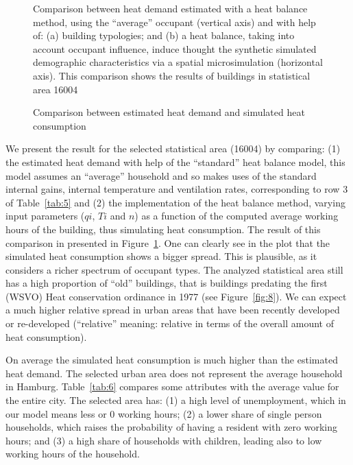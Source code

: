 \documentclass[11pt]{IJM-article}
\begin{document}
\begin{figure}[htb] 
    \centering 
    \caption{Comparison between estimated heat demand and simulated heat
    consumption}
    \label{fig:7}
    \begin{flushleft}
    \begin{footnotesize}
        Comparison between heat demand estimated with a heat balance method,
        using the ``average'' occupant (vertical axis) and with help of: (a)
        building typologies; and (b) a heat balance, taking into account
        occupant influence, induce thought the synthetic simulated demographic
        characteristics via a spatial microsimulation (horizontal axis). This
        comparison shows the results of buildings in statistical area 16004
    \end{footnotesize}
    \end{flushleft}
\end{figure}

We present the result for the selected statistical area (16004) by comparing:
(1) the estimated heat demand with help of the ``standard'' heat balance model,
this model assumes an ``average'' household and so makes uses of the standard
internal gains, internal temperature and ventilation rates, corresponding to
row 3 of Table~\ref{tab:5} and (2) the implementation of the heat balance
method, varying input parameters ($qi$, $Ti$ and $n$) as a function of the
computed average working hours of the building, thus simulating heat
consumption. The result of this comparison in presented in Figure~\ref{fig:7}.
One can clearly see in the plot that the simulated heat consumption shows a
bigger spread. This is plausible, as it considers a richer spectrum of occupant
types. The analyzed statistical area still has a high proportion of ``old''
buildings, that is buildings predating the first (WSVO) Heat conservation
ordinance in 1977 (see Figure~\ref{fig:8}). We can expect a much higher
relative spread in urban areas that have been recently developed or
re-developed (``relative'' meaning: relative in terms of the overall amount of
heat consumption).

On average the simulated heat consumption is much higher than the estimated
heat demand. The selected urban area does not represent the average household
in Hamburg.  Table~\ref{tab:6} compares some attributes with the average value
for the entire city. The selected area has: (1) a high level of unemployment,
which in our model means less or 0 working hours; (2) a lower share of single
person households, which raises the probability of having a resident with zero
working hours; and (3) a high share of households with children, leading also
to low working hours of the household.
\end{document}

